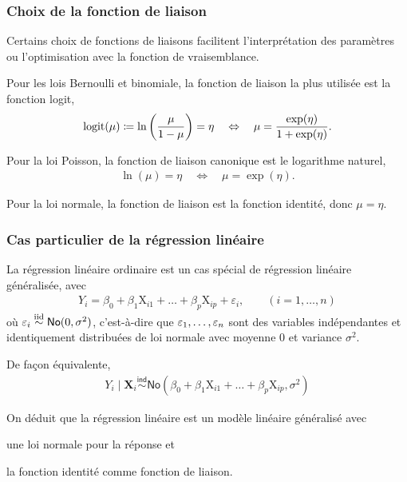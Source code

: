 \documentclass{beamer}
\begin{document}
\begin{frame}
\frametitle{Choix de la fonction de liaison}
Certains choix de fonctions de liaisons facilitent l'interprétation des paramètres ou l'optimisation avec la fonction de vraisemblance.
\bi
\item Pour les lois Bernoulli et binomiale, la fonction de liaison la plus utilisée est la fonction  \alert{logit}, 
\begin{align*}
\operatorname{logit}(\mu)\coloneqq  
\ln \left( \frac{\mu}{1-\mu} \right) = \eta \quad \Leftrightarrow \quad \mu = \frac{\exp(\eta)}{1+\exp(\eta)}.
\end{align*}

\item Pour la loi Poisson, la fonction de liaison canonique est le \alert{logarithme naturel},
\begin{align*}
\ln (\mu) = \eta  \quad \Leftrightarrow \quad \mu = \exp(\eta).                                                  \end{align*}

\item Pour la loi normale, la fonction de liaison est la fonction \alert{identité}, donc $\mu = \eta$.
\ei
\end{frame}

\begin{frame}
\frametitle{Cas particulier de la régression linéaire}
\bi
\item La régression linéaire ordinaire est un cas spécial de régression linéaire généralisée, avec
\begin{align*}
Y_i = \beta_0+ \beta_1 \mathrm{X}_{i1}+\ldots+\beta_p \mathrm{X}_{ip} + \varepsilon_i, \qquad (i=1, \ldots, n)
\end{align*}
où $\varepsilon_i \stackrel{\textnormal{iid}}{\sim} \mathsf{No}(0, \sigma^2)$, c'est-à-dire que $\varepsilon_1, \ldots, \varepsilon_n$ sont des variables indépendantes et identiquement distribuées de loi normale avec moyenne $0$ et variance $\sigma^2$.
\item De façon équivalente, 
\begin{align*}
Y_i\mid \mathbf{X}_i \stackrel{\mathsf{ind}}{\sim} \mathsf{No}(\beta_0+ \beta_1 \mathrm{X}_{i1}+\ldots+\beta_p \mathrm{X}_{ip}, \sigma^2)
\end{align*}
\item On déduit que la régression linéaire est un modèle linéaire généralisé avec
\bi
 
\item une loi normale pour la réponse et
\item la fonction identité comme fonction de liaison.
\ei 
\ei
\end{frame} 
\end{document}
